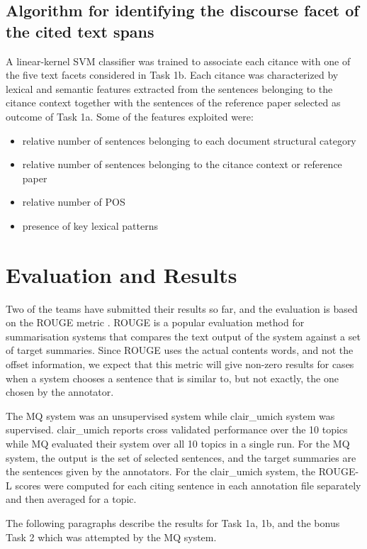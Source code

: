 \documentclass[11pt]{article}
\begin{document}
\subsection{Algorithm for identifying the discourse facet of the 
											cited text spans}
A linear-kernel SVM classifier was trained to associate each citance with one
 of the five text facets considered in Task 1b. Each citance was characterized 
 by lexical and semantic features extracted from the sentences belonging to 
 the citance context together with the sentences of the reference paper 
 selected as outcome of Task 1a.
Some of the features exploited were:
\begin{itemize}
\item{relative number of sentences belonging to each document structural 
		category}
\item{relative number of sentences belonging to the citance context or 
		reference paper}
\item{relative number of POS}
\item{presence of key lexical patterns}
\end{itemize}

\section{Evaluation and Results}
Two of the teams have submitted their results so far, and the evaluation 
is based on the ROUGE metric \cite{Lin:2004}. ROUGE is a popular evaluation
 method for summarisation systems that compares the text output of the system 
 against a set of target summaries. Since ROUGE uses the actual contents words, 
 and not the offset information, we expect that this metric will give non-zero 
 results for cases when a system chooses a sentence that is similar to, but not 
 exactly, the one chosen by the annotator.

The MQ system was an unsupervised system while clair\_umich system was 
supervised. clair\_umich reports cross validated performance over the 10 
topics while MQ evaluated their system over all 10 topics in a single run. 
For the MQ system, the output is the set of 
selected sentences, and the target summaries are the sentences given by the 
annotators.  For the clair\_umich system, the ROUGE-L scores were computed for 
each citing sentence in each annotation file separately and then averaged for 
a topic.

The following paragraphs describe the results for Task 1a, 1b, and the bonus 
Task 2 which was attempted by the MQ system. 
\end{document}
